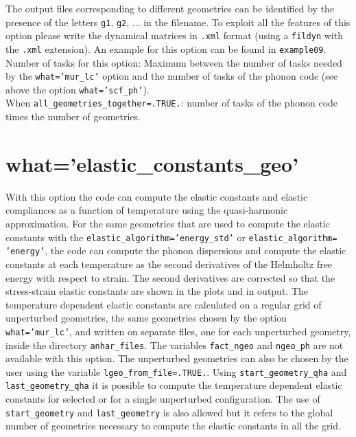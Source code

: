 \documentclass[12pt,a4paper,twoside]{report}
\begin{document}
The output files corresponding to different geometries can be identified
by the presence of the letters \texttt{g1}, \texttt{g2}, ... in the filename.
To exploit all the features of this option please write the dynamical matrices
in \texttt{.xml} format (using a \texttt{fildyn} with the \texttt{.xml}
extension).
An example for this option can be found in \texttt{example09}. \\
Number of tasks for this option: Maximum between the number of tasks  
needed by the \texttt{what='mur\_lc'} option and the number
of tasks of the phonon code (see above the option \texttt{what='scf\_ph'}). \\
When \texttt{all\_geometries\_together=.TRUE.}: number of tasks of the
phonon code times the number of geometries. \\

\newpage
{\color{coral}\section{what='elastic\_constants\_geo'}}
\color{black}

With this option the code can compute the elastic constants and elastic
compliances as a function of temperature using the quasi-harmonic
approximation. For the same geometries that are used to compute the
elastic constants with the \texttt{elastic\_algorithm='energy\_std'} or
\texttt{elastic\_algorithm=}
\texttt{'energy'}, the code can compute the phonon 
dispersions and compute the elastic constants at each temperature 
as the second derivatives of the Helmholtz free energy 
with respect to strain. The second derivatives are corrected so that
the stress-strain elastic constants are shown in the plots and in output. 
The temperature dependent elastic constants are calculated on a regular 
grid of unperturbed geometries, the same geometries chosen by the option
\texttt{what='mur\_lc'}, and written on separate files, one for
each unperturbed geometry, inside the directory \texttt{anhar\_files}.
The variables \texttt{fact\_ngeo} and \texttt{ngeo\_ph} are not 
available with this option. 
The unperturbed geometries can also be chosen by the user using the
variable \texttt{lgeo\_from\_file=.TRUE.}.
Using \texttt{start\_geometry\_qha} and \texttt{last\_geometry\_qha} it is
possible to compute the temperature dependent elastic constants for
selected or for a single unperturbed configuration. 
The use of \texttt{start\_geometry} and \texttt{last\_geometry} is
also allowed but it refers to the global number of geometries necessary 
to compute the elastic constants in all the grid. 
\end{document}
